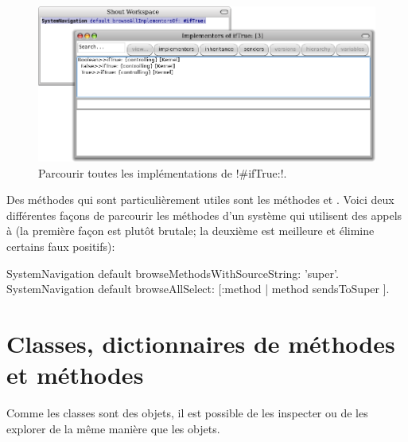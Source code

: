 \documentclass[a4paper,10pt,twoside]{book}
\begin{document}
\begin{figure}[ht]\centering
	\includegraphics[width=\linewidth]{implementors}
	\caption{Parcourir toutes les implémentations de \ct!\#ifTrue:!.}
\end{figure}

Des méthodes qui sont particulièrement utiles sont les méthodes  et . 
Voici deux différentes façons de parcourir les méthodes d'un système qui utilisent des appels à \super (la première façon est plutôt brutale; la deuxième est meilleure et élimine certains faux positifs):
\begin{code}{}
SystemNavigation default browseMethodsWithSourceString: 'super'.
SystemNavigation default browseAllSelect: [:method | method sendsToSuper ].
\end{code}

\section{Classes, dictionnaires de méthodes et méthodes}

Comme les classes sont des objets, il est possible de les inspecter ou de les explorer de la même manière que les objets.

\end{document}
